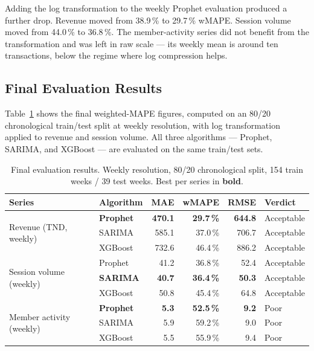 Adding the log transformation to the weekly Prophet evaluation produced a
further drop. Revenue moved from 38.9\,\% to 29.7\,\% wMAPE. Session volume
moved from 44.0\,\% to 36.8\,\%. The member-activity series did not benefit
from the transformation and was left in raw scale --- its weekly mean is
around ten transactions, below the regime where log compression helps.

\subsection{Final Evaluation Results}

Table~\ref{tab:forecast_comparison_final} shows the final weighted-MAPE
figures, computed on an 80/20 chronological train/test split at weekly
resolution, with log transformation applied to revenue and session volume.
All three algorithms --- Prophet, SARIMA, and XGBoost --- are evaluated on
the same train/test sets.

\begin{table}[H]
  \centering
  \caption{Final evaluation results. Weekly resolution, 80/20 chronological
           split, 154 train weeks / 39 test weeks. Best per series in
           \textbf{bold}.\label{tab:forecast_comparison_final}}
  \begin{tabular}{llrrrl}
    \toprule
    \textbf{Series} & \textbf{Algorithm} & \textbf{MAE} & \textbf{wMAPE} &
    \textbf{RMSE} & \textbf{Verdict} \\
    \midrule
    \multirow{3}{*}{Revenue (TND, weekly)}
      & \textbf{Prophet} & \textbf{470.1} & \textbf{29.7\,\%} & \textbf{644.8} & Acceptable \\
      & SARIMA  & 585.1 & 37.0\,\% & 706.7 & Acceptable \\
      & XGBoost & 732.6 & 46.4\,\% & 886.2 & Acceptable \\
    \midrule
    \multirow{3}{*}{Session volume (weekly)}
      & Prophet & 41.2 & 36.8\,\% & 52.4 & Acceptable \\
      & \textbf{SARIMA}  & \textbf{40.7} & \textbf{36.4\,\%} & \textbf{50.3} & Acceptable \\
      & XGBoost & 50.8 & 45.4\,\% & 64.8 & Acceptable \\
    \midrule
    \multirow{3}{*}{Member activity (weekly)}
      & \textbf{Prophet} & \textbf{5.3} & \textbf{52.5\,\%} & \textbf{9.2} & Poor \\
      & SARIMA  & 5.9 & 59.2\,\% & 9.0 & Poor \\
      & XGBoost & 5.5 & 55.9\,\% & 9.4 & Poor \\
    \bottomrule
  \end{tabular}
\end{table}


